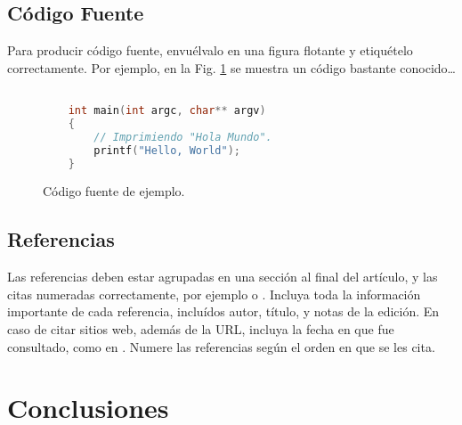 \documentclass[a4paper]{article}
\begin{document}
	\subsection{Código Fuente}\label{sub:listings}
		Para producir código fuente, envuélvalo en una figura flotante y
		etiquételo correctamente. Por ejemplo, en la Fig. \ref{fig:code}
		se muestra un código bastante conocido\ldots


		\begin{figure}[htb]%
			\begin{lstlisting}[language=c]%

    int main(int argc, char** argv)
    {
        // Imprimiendo "Hola Mundo".
        printf("Hello, World");
    }

			\end{lstlisting}
		\caption{Código fuente de ejemplo.\label{fig:code}}
		\end{figure}

	\subsection{Referencias}
  	Las referencias deben estar agrupadas en una sección al final del artículo,
  	y las citas numeradas correctamente, por ejemplo \cite{knuth} o \cite{goedel}.
  	Incluya toda la información importante de cada referencia, incluídos autor,
  	título, y notas de la edición. En caso de citar sitios web, además
  	de la URL, incluya la fecha en que fue consultado, como en \cite{wiki}. Numere 
  	las referencias según el orden en que se les cita.




\section{Conclusiones}\label{sec:conc}
\end{document}
